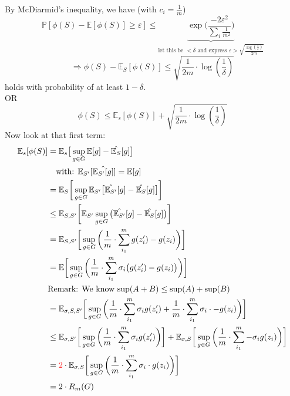 \documentclass[10pt,a4paper]{article}
\theoremstyle{remark}
\theoremstyle{definition}
\theoremstyle{plain}
\begin{document}
	By McDiarmid's inequality, we have (with $c_i = \frac{1}{m}$)
	$$
		\mathbb{P}[\phi(S) - \mathbb{E}[\phi(S)] \geq \varepsilon] \leq \underbrace{\exp \bigg(\frac{-2\varepsilon^2}{\sum_{i} \frac{1}{m^2} }\bigg)}_{\text{let this be $<\delta$ and express $\varepsilon > \sqrt{ \frac{\log(\frac{1}{\delta})}{2m} }$}}
	$$
	$$
	\Rightarrow \phi(S) - \mathbb{E}_S[\phi(S)] \leq \sqrt{\frac{1}{2m} \cdot \log(\frac{1}{\delta})}
	$$
	holds with probability of at least $1-\delta$.\\
	OR\\
	$$
		\phi(S) \leq \mathbb{E}_s[\phi(S)] + \sqrt{\frac{1}{2m} \cdot \log(\frac{1}{\delta})}
	$$
	Now look at that first term:
\begin{align*}
		\mathbb{E}_s[\phi(S)] &= \mathbb{E}_s \big[\sup_{g \in G} \mathbb{E}[g] - \hat{\mathbb{E}_{S}}[g]\big]\\
		&\ \ \ \text{with: } \mathbb{E}_{S'}[\hat{\mathbb{E}_{S'} [g]}] = \mathbb{E}[g]\\
		&= \mathbb{E}_S \bigg[ \sup_{g \in G} \mathbb{E}_{S'} \big[  \hat{\mathbb{E}_{S'}} [g] - \hat{\mathbb{E}_{S}} [g] \big] \bigg]\\
		&\leq \mathbb{E}_{S,S'} \bigg[ \mathbb{E}_{S'} \sup_{g \in G}\big(  \hat{\mathbb{E}_{S'}} [g] - \hat{\mathbb{E}_{S}} [g]\big) \bigg]\\
		&= \mathbb{E}_{S,S'}\bigg[ \sup_{g \in G} \bigg( \frac{1}{m} \cdot \sum_{i_1}^{m} g(z_{i}') - g(z_i)\bigg) \bigg]\\
		&= \mathbb{E} \bigg[ \sup_{g \in G} \bigg( \frac{1}{m} \cdot \sum_{i_1}^{m} \sigma_i \big( g(z_{i}') - g(z_i) \big)  \bigg)  \bigg]\\
		& \text{Remark: We know $ \sup(A+B) \leq \sup(A) + \sup(B)$}\\
		&= \mathbb{E}_{\sigma, S, S'}\bigg[ \sup_{g \in G} \bigg( \frac{1}{m} \cdot \sum_{i_1}^{m} \sigma_i  g(z_{i}')  + \frac{1}{m} \cdot \sum_{i_1}^{m} \sigma_i \cdot -g(z_{i})  \bigg)  \bigg]\\
		&\leq \mathbb{E}_{\sigma, S'}\bigg[ \sup_{g \in G} \bigg( \frac{1}{m} \cdot \sum_{i_1}^{m} \sigma_i g(z_{i}') \bigg) \bigg] +
		\mathbb{E}_{\sigma, S}\bigg[ \sup_{g \in G} \bigg( \frac{1}{m} \cdot \sum_{i_1}^{m} -\sigma_i g(z_{i})  \bigg) \bigg]\\
		&= \textcolor{red}{2} \cdot \mathbb{E}_{\sigma, S}\bigg[ \sup_{g \in G} \bigg( \frac{1}{m} \cdot \sum_{i_1}^{m} \sigma_i \cdot g(z_{i})  \bigg) \bigg] \\
		&= 2 \cdot R_m(G)
\end{align*}
\end{document}
